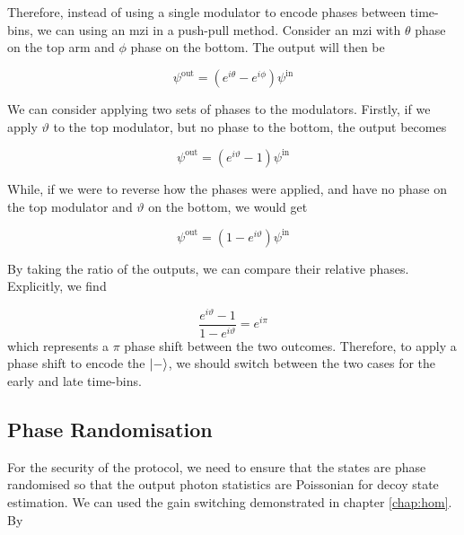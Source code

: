 Therefore, instead of using a single modulator to encode phases between time-bins, we can using an \ac{mzi} in a push-pull method. Consider an \ac{mzi} with $\theta$ phase on the top arm and $\phi$ phase on the bottom. The output will then be 

\begin{equation}
	\psi^\mathrm{out} =  \left(e^{i\theta} - e^{i\phi}\right) \psi^\mathrm{in}
\end{equation}

We can consider applying two sets of phases to the modulators. Firstly, if we apply $\vartheta$ to the top modulator, but no phase to the bottom, the output becomes

\begin{equation}
	\psi^\mathrm{out} =  \left(e^{i\vartheta} -1\right) \psi^\mathrm{in}
\end{equation}

While, if we were to reverse how the phases were applied, and have no phase on the top modulator and $\vartheta$ on the bottom, we would get

\begin{equation}
	\psi^\mathrm{out} =  \left(1 - e^{i\vartheta}\right) \psi^\mathrm{in}
\end{equation}

By taking the ratio of the outputs, we can compare their relative phases. Explicitly, we find

\begin{equation}
	\frac{e^{i\vartheta} -1}{1 - e^{i\vartheta}} = e^{i\pi}
\end{equation}
which represents a $\pi$ phase shift between the two outcomes. Therefore, to apply a phase shift to encode the $\ket{-}$, we should switch between the two cases for the early and late time-bins.


\subsection{Phase Randomisation}

For the security of the protocol, we need to ensure that the states are phase randomised so that the output photon statistics are Poissonian for decoy state estimation. We can used the gain switching demonstrated in chapter \ref{chap:hom}. By  

